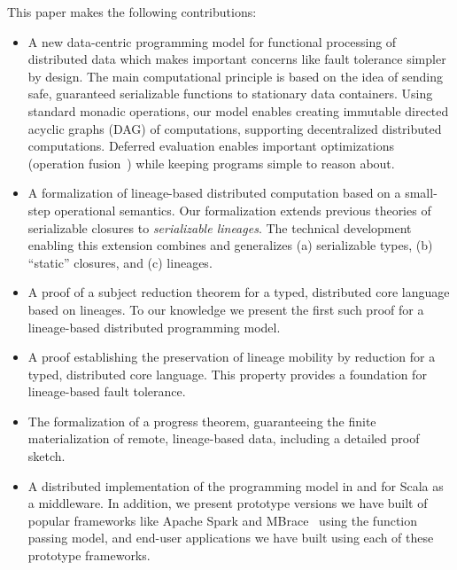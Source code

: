 \documentclass{jfp1}
\begin{document}
This paper makes the following contributions:
\begin{itemize}

  \item A new data-centric programming model for functional processing of
    distributed data which makes important concerns like fault tolerance simpler
    by design. The main computational principle is based on the idea of sending
    safe, guaranteed serializable functions to stationary data containers. Using standard
    monadic operations, our model enables creating immutable directed acyclic
    graphs (DAG) of computations, supporting decentralized distributed
    computations. Deferred evaluation enables important optimizations (operation
    fusion~\cite{FlumeJava}) while keeping programs simple to reason about.

  \item A formalization of lineage-based distributed computation based on a
    small-step operational semantics. Our formalization extends previous
    theories of serializable closures to {\em serializable lineages}. The
    technical development enabling this extension combines and generalizes (a)
    serializable types, (b) ``static'' closures, and (c) lineages.

  \item A proof of a subject reduction theorem for a typed, distributed core
    language based on lineages. To our knowledge we present the first such proof
    for a lineage-based distributed programming model.

  \item A proof establishing the preservation of lineage mobility by reduction
    for a typed, distributed core language. This property provides a foundation
    for lineage-based fault tolerance.

  \item The formalization of a progress theorem, guaranteeing the
    finite materialization of remote, lineage-based data, including a
    detailed proof sketch.

  \item A distributed implementation of the programming model in and for Scala
    as a middleware. In addition, we present prototype versions we have built of
    popular frameworks like Apache Spark and MBrace~\cite{MBrace} using the
    function passing model, and end-user applications we have built using each
    of these prototype frameworks.
  
\end{itemize}
\end{document}
